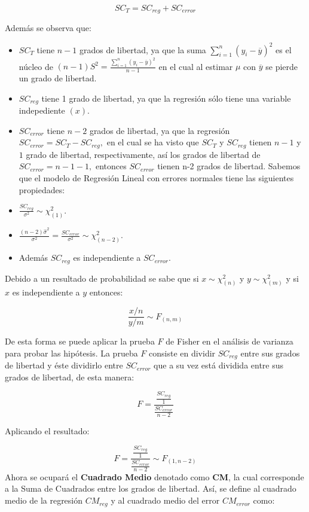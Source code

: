 \documentclass[a4paper,oneside,openany]{book}
\begin{document}
\[SC_{T}=SC_{reg}+SC_{error}\]

Además se observa que:

\begin{itemize}
\item
  \(SC_{T}\) tiene \(n-1\) grados de libertad, ya que la suma
  \(\sum_{i=1}^{n}(y_{i}-\overline{y})^2\) es el núcleo de
  \((n-1)S^2=\frac{\sum_{i=1}^{n}(y_{i}-\overline{y})^2}{n-1}\) en el
  cual al estimar \(\mu\) con \(\overline{y}\) se pierde un grado de
  libertad.
\item
  \(SC_{reg}\) tiene 1 grado de libertad, ya que la regresión sólo tiene
  una variable indepediente \((x).\)
\item
  \(SC_{error}\) tiene \(n-2\) grados de libertad, ya que la regresión
  \(SC_{error}=SC_{T}-SC_{reg},\) en el cual se ha visto que \(SC_{T}\)
  y \(SC_{reg}\) tienen \(n-1\) y \(1\) grado de libertad,
  respectivamente, así los grados de libertad de \(SC_{error}=n-1-1,\)
  entonces \(SC_{error}\) tienen n-2 grados de libertad. Sabemos que el
  modelo de Regresión Lineal con errores normales tiene las siguientes
  propiedades:
\item
  \(\frac{SC_{reg}}{\sigma^2}\sim \chi^2_{(1)}.\)
\item
  \(\frac{(n-2)\hat{\sigma}^2}{\sigma^2}=\frac{SC_{error}}{\sigma^2}\sim\chi^2_{(n-2)}.\)
\item
  Además \(SC_{reg}\) es independiente a \(SC_{error}.\)
\end{itemize}

Debido a un resultado de probabilidad se sabe que si
\(x \sim \chi^2_{(n)}\) y \(y \sim \chi^2_{(m)}\) y si \(x\) es
independiente a \(y\) entonces:

\[\frac{x/n}{y/m}\sim F_{(n,m)}\]

De esta forma se puede aplicar la prueba \(F\) de Fisher en el análisis
de varianza para probar las hipótesis. La prueba \(F\) consiste en
dividir \(SC_{reg}\) entre sus grados de libertad y éste dividirlo entre
\(SC_{error}\) que a su vez está dividida entre sus grados de libertad,
de esta manera:

\[F=\frac{\frac{SC_{reg}}{1}}{\frac{SC_{error}}{n-2}}\]

Aplicando el resultado:

\[F=\frac{\frac{SC_{reg}}{1}}{\frac{SC_{error}}{n-2}} \sim F_{(1,n-2)}\]
Ahora se ocupará el \textbf{Cuadrado Medio} denotado como \textbf{CM},
la cual corresponde a la Suma de Cuadrados entre los grados de libertad.
Así, se define al cuadrado medio de la regresión \(CM_{reg}\) y al
cuadrado medio del error \(CM_{error}\) como:
\end{document}

